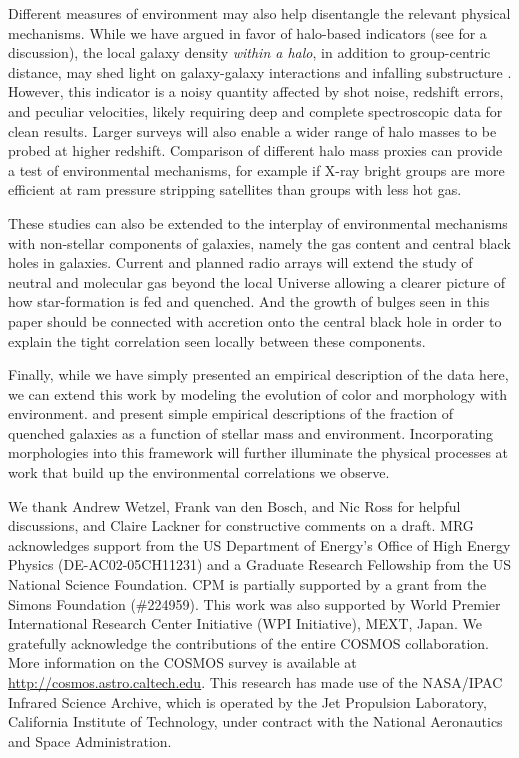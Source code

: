 \documentclass[12pt]{emulateapj}
\begin{document}
Different measures of environment may also help disentangle the
relevant physical mechanisms. While we have argued in favor of
halo-based indicators (see \citealt{George2011} for a discussion), the
local galaxy density \textit{within a halo}, in addition to
group-centric distance, may shed light on galaxy-galaxy interactions
and infalling substructure \citep[e.g.,][]{Blanton2007, Cibinel2012b,
  Woo2012}. However, this indicator is a noisy quantity affected by
shot noise, redshift errors, and peculiar velocities, likely
requiring deep and complete spectroscopic data for clean
results. Larger surveys will also enable a wider range of halo masses
to be probed at higher redshift. Comparison of different halo mass
proxies can provide a test of environmental mechanisms, for example if
X-ray bright groups are more efficient at ram pressure stripping
satellites than groups with less hot gas.

These studies can also be extended to the interplay of environmental
mechanisms with non-stellar components of galaxies, namely the gas
content and central black holes in galaxies. Current and planned radio
arrays will extend the study of neutral and molecular gas beyond the
local Universe allowing a clearer picture of how star-formation is fed and
quenched. And the growth of bulges seen in this paper should be
connected with accretion onto the central black hole in order to
explain the tight correlation seen locally between these components.

Finally, while we have simply presented an empirical description of
the data here, we can extend this work by modeling the evolution of
color and morphology with environment. \citet{Peng2010} and
\citet{Wetzel2012b} present simple empirical descriptions of the
fraction of quenched galaxies as a function of stellar mass and
environment. Incorporating morphologies into this framework will
further illuminate the physical processes at work that build up the
environmental correlations we observe.


\acknowledgments 

We thank Andrew Wetzel, Frank van den Bosch, and Nic Ross for helpful
discussions, and Claire Lackner for constructive comments on a draft.
MRG acknowledges support from the US Department of Energy's Office of
High Energy Physics (DE-AC02-05CH11231) and a Graduate Research
Fellowship from the US National Science Foundation. CPM is partially supported by a grant from
the Simons Foundation (\#224959). This work was also
supported by World Premier International Research Center Initiative
(WPI Initiative), MEXT, Japan. We gratefully acknowledge the
contributions of the entire COSMOS collaboration. More information on
the COSMOS survey is available at \url{http://cosmos.astro.caltech.edu}.  This research has made use
of the NASA/IPAC Infrared Science Archive, which is operated by the
Jet Propulsion Laboratory, California Institute of Technology, under
contract with the National Aeronautics and Space Administration.

\mbox{~} %


%




\end{document}
